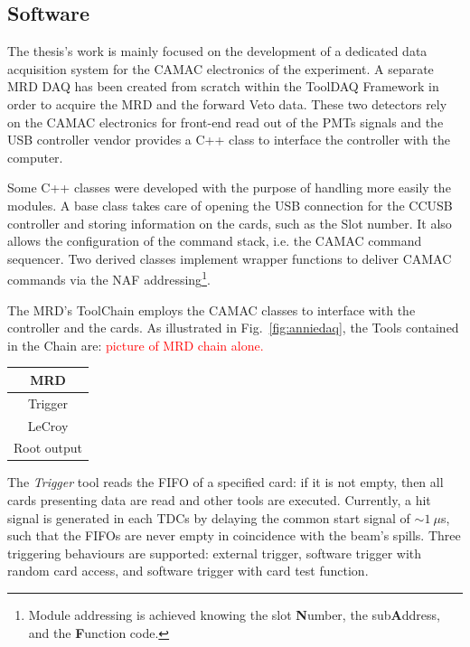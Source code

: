 \subsection{Software}

The thesis's work is mainly focused on the development of a dedicated data acquisition system %
for the CAMAC electronics of the experiment.
A separate MRD DAQ has been created from scratch within the ToolDAQ Framework in order %
to acquire the MRD and the forward Veto data.
These two detectors rely on the CAMAC electronics for front-end read out of the PMTs %
signals and the USB controller vendor provides a C++ class to interface the controller with the %
computer.

Some C++ classes were developed with the purpose of handling more easily the modules.
A base class takes care of opening the USB connection for the CCUSB controller and storing %
information on the cards, such as the Slot number.
It also allows the configuration of the command stack, i.e. the CAMAC command sequencer.
Two derived classes implement wrapper functions to deliver CAMAC commands via the %
NAF addressing\footnote{Module addressing is achieved knowing the slot \textbf{N}umber, %
the sub\textbf{A}ddress, and the \textbf{F}unction code.}.

The MRD's ToolChain employs the CAMAC classes to interface with the controller and the cards.
As illustrated in Fig.~\ref{fig:anniedaq}, the Tools contained in the Chain are:
\textcolor{red}{picture of MRD chain alone.}

\begin{center}
  \small
  \begin{tabular}{c}
    \toprule
    \textbf{MRD}	\\
    \midrule
    Trigger	\\
    LeCroy 	\\
    Root output	\\
    \bottomrule
  \end{tabular}
\end{center}

The \emph{Trigger} tool reads the FIFO of a specified card: if it is not empty, then all %
cards presenting data are read and other tools are executed.
Currently, a hit signal is generated in each TDCs by delaying the common start %
signal of $\sim 1~\mu$s, such that the FIFOs are never empty in coincidence with the beam's spills.
Three triggering behaviours are supported: external trigger, software trigger with %
random card access, and software trigger with card test function.

